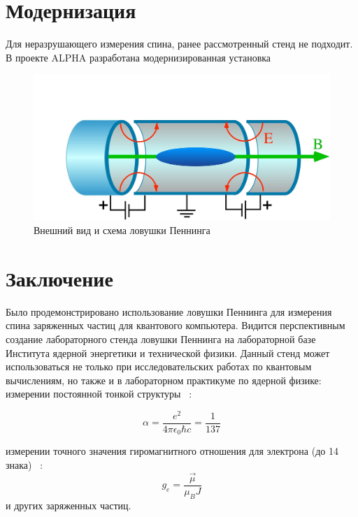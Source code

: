 \documentclass[11pt]{article}
\begin{document}
\section{Модернизация}
Для неразрушающего измерения спина, ранее рассмотренный стенд не подходит. В проекте ALPHA разработана модернизированная установка ~\cite{Alpha} \\
\begin{figure}[htp]
\centering
\includegraphics[scale=0.10]{Penning_Trap}
\caption{Внешний вид и схема ловушки Пеннинга ~\cite{Courcera_NPh,Mart}}
\label{}
\end{figure}

\section{Заключение}
Было продемонстрировано использование ловушки Пеннинга для измерения спина заряженных частиц для квантового компьютера. Видится перспективным создание лабораторного стенда ловушки Пеннинга на лабораторной базе Института ядерной энергетики и технической физики. Данный стенд может использоваться не только при исследовательских работах по квантовым вычислениям, но также и в лабораторном практикуме по ядерной физике: \\
измерении постоянной тонкой структуры ~\cite{Sarycheva}:

\begin{equation*}
\alpha = \frac{e^2}{4\pi\epsilon_0\hbar c} = \frac{1}{137}
\end{equation*}

измерении точного значения гиромагнитного отношения для электрона (до 14 знака) ~\cite{Mart}:
\begin{equation*}
g_e=\frac{\vec\mu}{\mu_B J} 
\end{equation*}
и других заряженных частиц.
\end{document}
